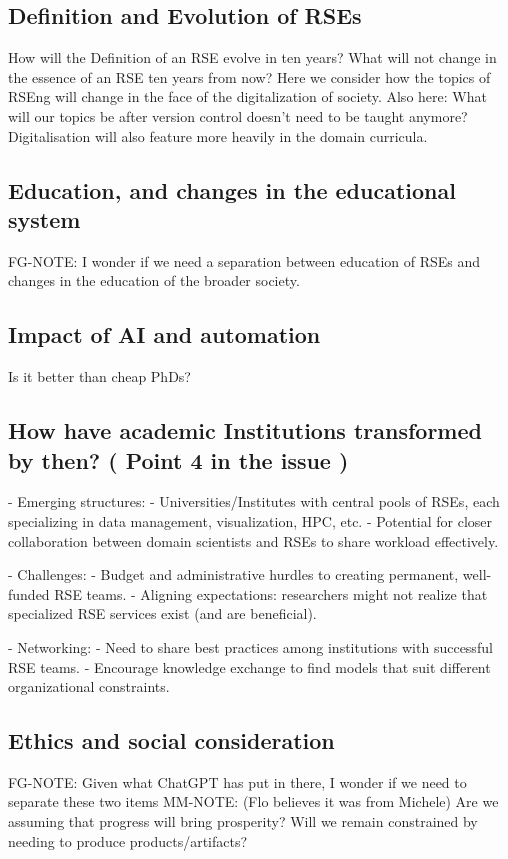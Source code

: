 \documentclass{eceasst}
\begin{document}
\subsection{Definition and Evolution of RSEs}
How will the Definition of an RSE evolve in ten years?
What will not change in the essence of an RSE ten years from now?
Here we consider how the topics of RSEng will change in the face of the digitalization of society.
Also here: What will our topics be after version control doesn’t need to be taught anymore? Digitalisation will also feature more heavily in the domain curricula.


\subsection{Education, and changes in the educational system}
FG-NOTE: I wonder if we need a separation between education of RSEs and changes in the education of the broader society.

\subsection{Impact of AI and automation}
Is it better than cheap PhDs?

\subsection{How have academic Institutions transformed by then? ( Point 4 in the issue )}
- Emerging structures:
  - Universities/Institutes with central pools of RSEs, each specializing in data management, visualization, HPC, etc.
  - Potential for closer collaboration between domain scientists and RSEs to share workload effectively.

- Challenges:
  - Budget and administrative hurdles to creating permanent, well-funded RSE teams.
  - Aligning expectations: researchers might not realize that specialized RSE services exist (and are beneficial).

- Networking:
  - Need to share best practices among institutions with successful RSE teams.
  - Encourage knowledge exchange to find models that suit different organizational constraints.

\subsection{Ethics and social consideration}
FG-NOTE: Given what ChatGPT has put in there, I wonder if we need to separate these two items
MM-NOTE: (Flo believes it was from Michele) Are we assuming that progress will bring prosperity? Will we remain constrained by needing to produce products/artifacts?
\end{document}
